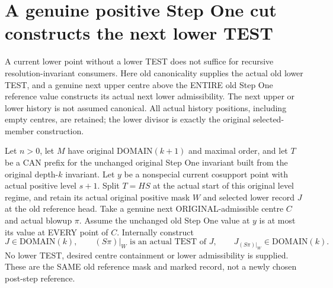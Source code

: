 \section{A genuine positive Step One cut constructs the next lower TEST}

A current lower point without a lower TEST does not suffice for recursive
resolution-invariant consumers. Here old canonicality supplies the actual
old lower TEST, and a genuine next upper centre above the ENTIRE old Step
One reference value constructs its actual next lower admissibility. The
next upper or lower history is not assumed canonical. All actual history positions, including empty centres, are retained; the
lower divisor is exactly the original selected-member construction.

\begin{theorem}
\label{hir:original-positive-stepone-cut-actual-lower-test}
\leanok
Let $n>0$, let $M$ have original DOMAIN$(k+1)$ and maximal order, and let
$T$ be a CAN prefix for the unchanged original Step One invariant built
from the original depth-$k$ invariant. Let $y$ be a nonspecial current
cosupport point with actual positive level $s+1$. Split $T=HS$ at the
actual start of this original level regime, and retain its actual original
positive mask $W$ and selected lower record $J$ at the old reference head.
Take a genuine next ORIGINAL-admissible centre $C$ and actual blowup $\pi$.
Assume the unchanged old Step One value at $y$ is at most its value at
EVERY point of $C$. Internally construct
\[
 J\in\mathrm{DOMAIN}(k),\qquad
 (S\pi)|_W\text{ is an actual TEST of }J,\qquad
 J_{(S\pi)|_W}\in\mathrm{DOMAIN}(k).
\]
No lower TEST, desired centre containment or lower admissibility is supplied.
These are the SAME old reference mask and marked record, not a newly chosen
post-step reference.
\end{theorem}
